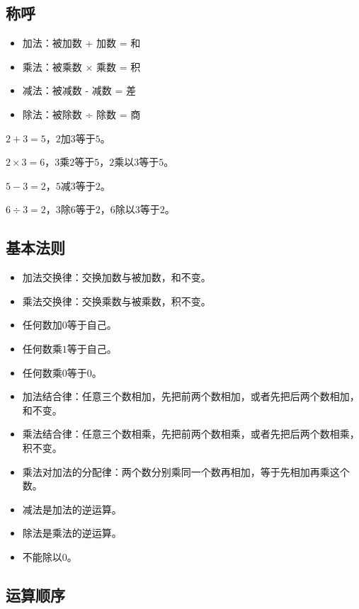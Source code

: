 \documentclass[12pt,UTF8]{ctexbook}
\begin{document}
\subsection{称呼}

\begin{itemize}
\item 加法：被加数 + 加数 = 和
\item 乘法：被乘数 × 乘数 = 积
\item 减法：被减数 - 减数 = 差
\item 除法：被除数 ÷ 除数 = 商
\end{itemize}

\(  2 + 3 = 5  \)，\( 2 \)加\( 3 \)等于\( 5 \)。

\(  2 \times 3 = 6  \)，\( 3 \)乘\( 2 \)等于\( 5 \)，\( 2 \)乘以\( 3 \)等于\( 5 \)。

\(  5 - 3 = 2  \)，\( 5 \)减\( 3 \)等于\( 2 \)。

\(  6 \div 3 = 2  \)，\( 3 \)除\( 6 \)等于\( 2 \)，\( 6 \)除以\( 3 \)等于\( 2 \)。

\subsection{基本法则}

\begin{itemize}
\item 加法交换律：交换加数与被加数，和不变。
\item 乘法交换律：交换乘数与被乘数，积不变。
\item 任何数加\( 0 \)等于自己。
\item 任何数乘\( 1 \)等于自己。
\item 任何数乘\( 0 \)等于\( 0 \)。
\item 加法结合律：任意三个数相加，先把前两个数相加，或者先把后两个数相加，和不变。
\item 乘法结合律：任意三个数相乘，先把前两个数相乘，或者先把后两个数相乘，积不变。
\item 乘法对加法的分配律：两个数分别乘同一个数再相加，等于先相加再乘这个数。
\item 减法是加法的逆运算。
\item 除法是乘法的逆运算。
\item 不能除以\( 0 \)。
\end{itemize}

\subsection{运算顺序}
\end{document}
